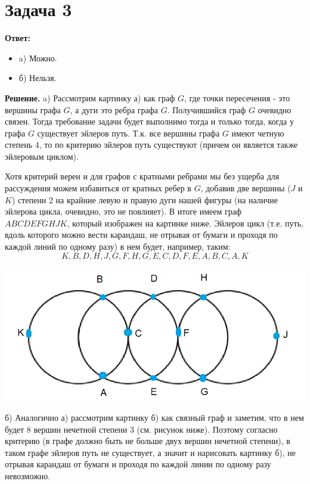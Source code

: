 \documentclass{article}
\begin{document}
\section*{Задача 3}
{\bf Ответ:}
\begin{itemize}
\item a) Можно.
\item б) Нельзя.
\end{itemize}
{\bf Решение.} a) Рассмотрим картинку а) как граф $G$, где точки пересечения - это вершины графа $G$, а дуги это ребра графа $G$. Получившийся граф $G$ очевидно связен. Тогда требование задачи будет выполнимо тогда и только тогда, когда у графа $G$ существует эйлеров путь. Т.к. все вершины графа $G$ имеют четную степень 4, то по критерию эйлеров путь существуют (причем он является также эйлеровым циклом).
\par
Хотя критерий верен и для графов с кратными ребрами мы без ущерба для рассуждения можем избавиться от кратных ребер в $G$, добавив две вершины ($J$ и $K$) степени 2 на крайние левую и правую дуги нашей фигуры (на наличие эйлерова цикла, очевидно, это не повлияет). В итоге имеем граф $ABCDEFGHJK$, который изображен на картинке ниже. Эйлеров цикл (т.е. путь, вдоль которого можно вести карандаш, не отрывая от бумаги и проходя по каждой линий по одному разу) в нем будет, например, таким: 
$$K,B,D,H,J,G,F,H,G,E,C,D,F,E,A,B,C,A,K$$
\\
{\includegraphics[scale=0.3]{img/img1.jpg}}
\par
б) Аналогично а) рассмотрим картинку б) как связный граф и заметим, что в нем будет 8 вершин нечетной степени 3 (см. рисунок ниже). Поэтому согласно критерию (в графе должно быть не больше двух вершин нечетной степени), в таком графе эйлеров путь не существует, а значит и нарисовать картинку б), не отрывая карандаш от бумаги и проходя по каждой линии по одному разу невозможно.
\\
\end{document}
